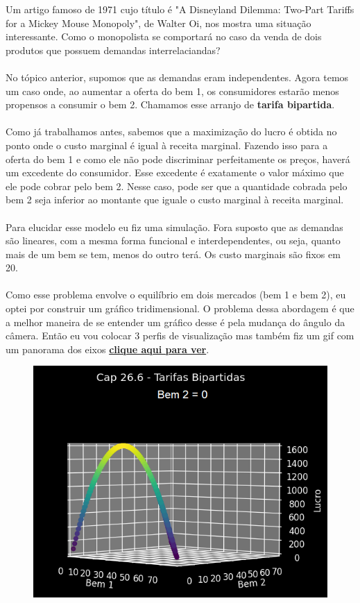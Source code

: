 \documentclass[a4paper,11pt,oneside]{book}
\theoremstyle{definition}
\theoremstyle{break}
\begin{document}
Um artigo famoso de 1971 cujo título é "A Disneyland Dilemma: Two-Part Tariffs for a Mickey Mouse Monopoly", de Walter Oi, nos mostra uma situação interessante. Como o monopolista se comportará no caso da venda de dois produtos que possuem demandas interrelaciandas?
\\
\\
No tópico anterior, supomos que as demandas eram independentes. Agora temos um caso onde, ao aumentar a oferta do bem 1, os consumidores estarão menos propensos a consumir o bem 2. Chamamos esse arranjo de \textbf{tarifa bipartida}.
\\
\\
Como já trabalhamos antes, sabemos que a maximização do lucro é obtida no ponto onde o custo marginal é igual à receita marginal. Fazendo isso para a oferta do bem 1 e como ele não pode discriminar perfeitamente os preços, haverá um excedente do consumidor. Esse excedente é exatamente o valor máximo que ele pode cobrar pelo bem 2. Nesse caso, pode ser que a quantidade cobrada pelo bem 2 seja inferior ao montante que iguale o custo marginal à receita marginal.
\\
\\
Para elucidar esse modelo eu fiz uma simulação. Fora suposto que as demandas são lineares, com a mesma forma funcional e interdependentes, ou seja, quanto mais de um bem se tem, menos do outro terá. Os custo marginais são fixos em 20.
\\
\\
Como esse problema envolve o equilíbrio em dois mercados (bem 1 e bem 2), eu optei por construir um gráfico tridimensional. O problema dessa abordagem é que a melhor maneira de se entender um gráfico desse é pela mudança do ângulo da câmera. Então eu vou colocar 3 perfis de visualização mas também fiz um gif com um panorama dos eixos \href{https://github.com/brunoruas2/Meus_Estudos/blob/main/Microeconomia/Microeconomics\%20-\%20Hal\%20Varian/images/cap26_6-tarifas_bipartidas.gif}{\textbf{clique aqui para ver}}.

\begin{figure}[H]
\centering
\includegraphics[scale=0.6]{cap26_6-tarifas_bipartidas1.png}
\end{figure}
\end{document}
